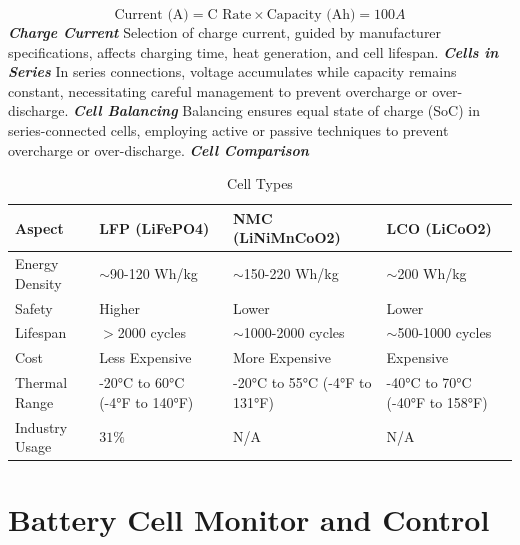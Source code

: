 \[ \text{Current (A)} = \text{C Rate} \times \text{Capacity (Ah)} = 100A \]
\noindent
\textbf{\emph{Charge Current}}\newline
\noindent
Selection of charge current, guided by manufacturer specifications, affects charging time, heat generation, and cell lifespan.\newline\newline
\noindent
\textbf{\emph{Cells in Series}}\newline
\noindent
In series connections, voltage accumulates while capacity remains constant, necessitating careful management to prevent overcharge or over-discharge.\newline\newline
\noindent
\textbf{\emph{Cell Balancing}}\newline
\noindent
Balancing ensures equal state of charge (SoC) in series-connected cells, employing active or passive techniques to prevent overcharge or over-discharge.\newline\newline
\noindent
\textbf{\emph{Cell Comparison}}
\begin{table}[h]
    \centering
    \caption{Cell Types \cite{cell_COMP1}\cite{cell_COMP2}}
    \label{tab:cell_comparison}
    \begin{tabular}{|p{2.7cm}|p{3.8cm}|p{3.8cm}|p{3.8cm}|}
        \hline
        Aspect & LFP (LiFePO4) & NMC (LiNiMnCoO2) & LCO (LiCoO2) \\
        \hline
        Energy Density & $\sim$90-120 Wh/kg & $\sim$150-220 Wh/kg & $\sim$200 Wh/kg \\
        \hline
        Safety & Higher & Lower & Lower \\
        \hline
        Lifespan & $>$2000 cycles & $\sim$1000-2000 cycles & $\sim$500-1000 cycles \\
        \hline
        Cost & Less Expensive & More Expensive & Expensive \\
        \hline
        Thermal Range & -20°C to 60°C (-4°F to 140°F) & -20°C to 55°C (-4°F to 131°F) & -40°C to 70°C (-40°F to 158°F) \\
        \hline
        Industry Usage & $31\%$ & N/A & N/A \\
        \hline
    \end{tabular}
\end{table}

\newpage
\section{Battery Cell Monitor and Control}\label{sec:Cell_M}
